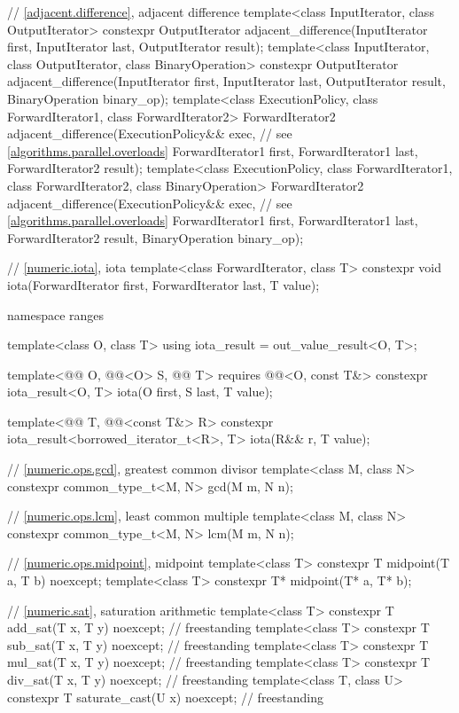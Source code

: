 \begin{codeblock}
{  // \ref{adjacent.difference}, adjacent difference
  template<class InputIterator, class OutputIterator>
    constexpr OutputIterator
      adjacent_difference(InputIterator first, InputIterator last,
                          OutputIterator result);
  template<class InputIterator, class OutputIterator, class BinaryOperation>
    constexpr OutputIterator
      adjacent_difference(InputIterator first, InputIterator last,
                          OutputIterator result, BinaryOperation binary_op);
  template<class ExecutionPolicy, class ForwardIterator1, class ForwardIterator2>
    ForwardIterator2
      adjacent_difference(ExecutionPolicy&& exec,               // see \ref{algorithms.parallel.overloads}
                          ForwardIterator1 first, ForwardIterator1 last,
                          ForwardIterator2 result);
  template<class ExecutionPolicy, class ForwardIterator1, class ForwardIterator2,
           class BinaryOperation>
    ForwardIterator2
      adjacent_difference(ExecutionPolicy&& exec,               // see \ref{algorithms.parallel.overloads}
                          ForwardIterator1 first, ForwardIterator1 last,
                          ForwardIterator2 result, BinaryOperation binary_op);

  // \ref{numeric.iota}, iota
  template<class ForwardIterator, class T>
    constexpr void iota(ForwardIterator first, ForwardIterator last, T value);

  namespace ranges {
    template<class O, class T>
      using iota_result = out_value_result<O, T>;

    template<@@ O, @@<O> S, @@ T>
      requires @@<O, const T&>
      constexpr iota_result<O, T> iota(O first, S last, T value);

    template<@@ T, @@<const T&> R>
      constexpr iota_result<borrowed_iterator_t<R>, T> iota(R&& r, T value);
  }

  // \ref{numeric.ops.gcd}, greatest common divisor
  template<class M, class N>
    constexpr common_type_t<M, N> gcd(M m, N n);

  // \ref{numeric.ops.lcm}, least common multiple
  template<class M, class N>
    constexpr common_type_t<M, N> lcm(M m, N n);

  // \ref{numeric.ops.midpoint}, midpoint
  template<class T>
    constexpr T midpoint(T a, T b) noexcept;
  template<class T>
    constexpr T* midpoint(T* a, T* b);

  // \ref{numeric.sat}, saturation arithmetic
  template<class T>
    constexpr T add_sat(T x, T y) noexcept;                     // freestanding
  template<class T>
    constexpr T sub_sat(T x, T y) noexcept;                     // freestanding
  template<class T>
    constexpr T mul_sat(T x, T y) noexcept;                     // freestanding
  template<class T>
    constexpr T div_sat(T x, T y) noexcept;                     // freestanding
  template<class T, class U>
    constexpr T saturate_cast(U x) noexcept;                    // freestanding
}
\end{codeblock}

